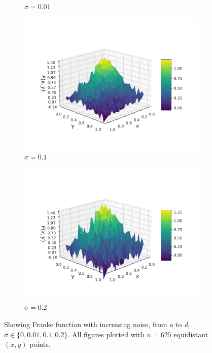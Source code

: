 \documentclass[twocolumn,english,notitlepage]{article}
\begin{document}
\begin{appendices}
\begin{figure}
\begin{subfigure}{.5\textwidth}
                \caption{$\sigma = 0.01$}
            \end{subfigure}
            \hfill
            \begin{subfigure}{.5\textwidth}
                \centering
                \includegraphics[width=.9\linewidth]{franke_functions_0_1.pdf}
                \caption{$\sigma = 0.1$}
            \end{subfigure}
            \begin{subfigure}{.5\textwidth}
                \centering
                \includegraphics[width=.9\linewidth]{franke_functions_0_2.pdf}
                \caption{$\sigma = 0.2$}

            \end{subfigure}
        
            \caption{Showing Franke function with increasing noise, from \textit{a} to \textit{d}, $\sigma \in \{ 0, 0.01, 0.1, 0.2\}$. All figures plotted with $n = 625$ equidistant $(x,y)$ points.}\label{app:fig:frankefunction varying noise}
        \end{figure}


\end{appendices}
\end{document}
